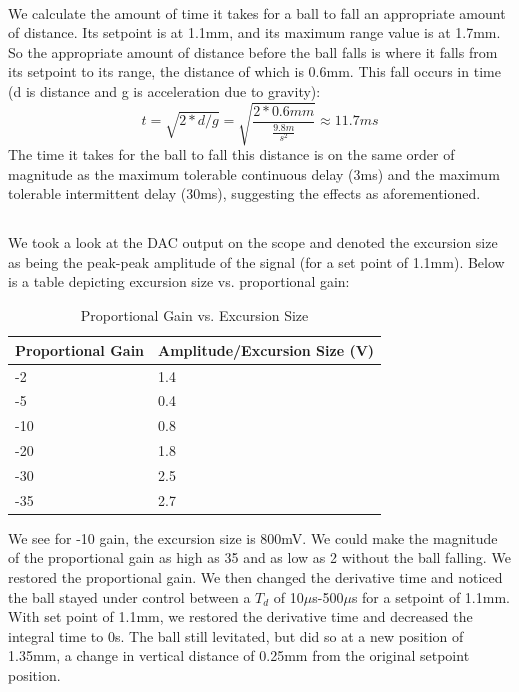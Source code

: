 \documentclass{article}
\begin{document}
    \\\indent We calculate the  amount of time it takes for a ball to fall an appropriate amount of distance. Its setpoint is at 1.1mm, and its maximum range value is at 1.7mm. So the appropriate amount of distance before the ball falls is where it falls from its setpoint to its range, the distance of which is 0.6mm. This fall occurs in time (d is distance and g is acceleration due to gravity):
    \begin{equation}
        t = \sqrt{2*d/g} = \sqrt{\frac{2*0.6mm}{\frac{9.8m}{s^{2}}}} \approx 11.7 ms 
    \end{equation}
    The time it takes for the ball to fall this distance is on the same order of magnitude as the maximum tolerable continuous delay (3ms) and the maximum tolerable intermittent delay (30ms), suggesting the effects as aforementioned. 

\subsection{}
    We took a look at the DAC output on the scope and denoted the excursion size as being the peak-peak amplitude of the signal (for a set point of 1.1mm). Below is a table depicting excursion size vs. proportional gain:
    \begin{table}[H]
        \centering
        \caption{Proportional Gain vs. Excursion Size}
        \label{my-label}
        \begin{tabular}{ll}
        \textbf{Proportional Gain} & \textbf{Amplitude/Excursion Size (V)} \\ \hline
        -2 & 1.4 \\
        -5 & 0.4 \\
        -10 & 0.8 \\
        -20 & 1.8 \\
        -30 & 2.5 \\
        -35 & 2.7
        \end{tabular}
        \end{table}
    We see for -10 gain, the excursion size is 800mV. We could make the magnitude of the proportional gain as high as 35 and as low as 2 without the ball falling. We restored the proportional gain. We then changed the derivative time and noticed the ball stayed under control between a $T_d$ of 10$\mu$s-500$\mu$s for a setpoint of 1.1mm. With set point of 1.1mm, we restored the derivative time and decreased the integral time to 0s. The ball still levitated, but did so at a new position of 1.35mm, a change in vertical distance of 0.25mm from the original setpoint position.
\end{document}
